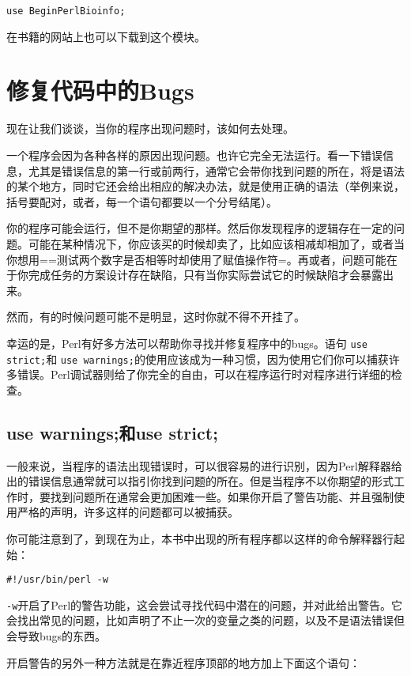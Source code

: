 \begin{lstlisting}
use BeginPerlBioinfo;
\end{lstlisting}

在书籍的网站上也可以下载到这个模块。

\section{修复代码中的Bugs}
现在让我们谈谈，当你的程序出现问题时，该如何去处理。

一个程序会因为各种各样的原因出现问题。也许它完全无法运行。看一下错误信息，尤其是错误信息的第一行或前两行，通常它会带你找到问题的所在，将是语法的某个地方，同时它还会给出相应的解决办法，就是使用正确的语法（举例来说，括号要配对，或者，每一个语句都要以一个分号结尾）。

你的程序可能会运行，但不是你期望的那样。然后你发现程序的逻辑存在一定的问题。可能在某种情况下，你应该买的时候却卖了，比如应该相减却相加了，或者当你想用==测试两个数字是否相等时却使用了赋值操作符=。再或者，问题可能在于你完成任务的方案设计存在缺陷，只有当你实际尝试它的时候缺陷才会暴露出来。

然而，有的时候问题可能不是明显，这时你就不得不开挂了。

幸运的是，Perl有好多方法可以帮助你寻找并修复程序中的bugs。语句 \verb|use strict;|和 \verb|use warnings;|的使用应该成为一种习惯，因为使用它们你可以捕获许多错误。Perl调试器则给了你完全的自由，可以在程序运行时对程序进行详细的检查。

\subsection{use warnings;和use strict;}
一般来说，当程序的语法出现错误时，可以很容易的进行识别，因为Perl解释器给出的错误信息通常就可以指引你找到问题的所在。但是当程序不以你期望的形式工作时，要找到问题所在通常会更加困难一些。如果你开启了警告功能、并且强制使用严格的声明，许多这样的问题都可以被捕获。

你可能注意到了，到现在为止，本书中出现的所有程序都以这样的命令解释器行起始：

\begin{lstlisting}
#!/usr/bin/perl -w
\end{lstlisting}

 \verb|-w|开启了Perl的警告功能，这会尝试寻找代码中潜在的问题，并对此给出警告。它会找出常见的问题，比如声明了不止一次的变量之类的问题，以及不是语法错误但会导致bugs的东西。

开启警告的另外一种方法就是在靠近程序顶部的地方加上下面这个语句：

